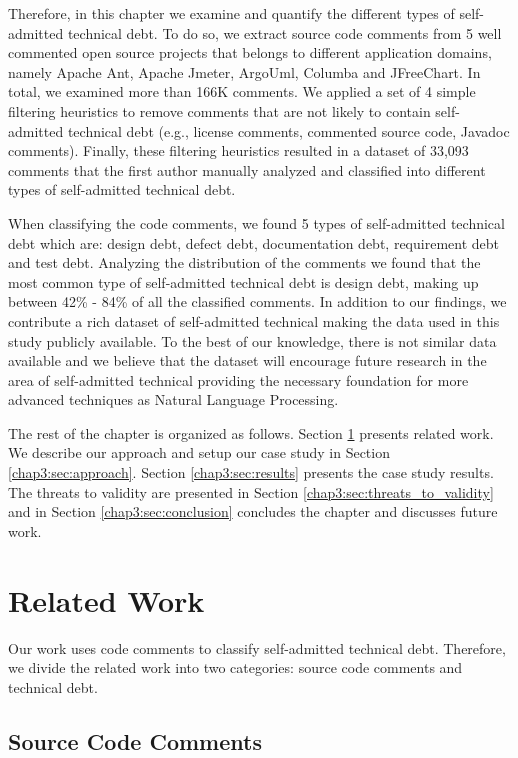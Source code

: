 Therefore, in this chapter we examine and quantify the different types of self-admitted technical debt. To do so, we extract source code comments from 5 well commented open source projects that belongs to different application domains, namely Apache Ant, Apache Jmeter, ArgoUml, Columba and JFreeChart. In total, we examined more than 166K comments. We applied a set of 4 simple filtering heuristics to remove comments that are not likely to contain self-admitted technical debt (e.g., license comments, commented source code, Javadoc comments). Finally, these filtering heuristics resulted in a dataset of 33,093 comments that the first author manually analyzed and classified into different types of self-admitted technical debt.

When classifying the code comments, we found 5 types of self-admitted technical debt which are: design debt, defect debt, documentation debt, requirement debt and test debt. Analyzing the distribution of the comments we found that the most common type of self-admitted technical debt is design debt, making up between 42\% - 84\% of all the classified comments. In addition to our findings, we contribute a rich dataset of self-admitted technical making the data used in this study publicly available. To the best of our knowledge, there is not similar data available and we believe that the dataset will encourage future research in the area of self-admitted technical providing the necessary foundation for more advanced techniques as Natural Language Processing.  

The rest of the chapter is organized as follows. Section \ref{chap3:sec:related_work} presents related work. We describe our approach and setup our case study in Section \ref{chap3:sec:approach}. Section \ref{chap3:sec:results} presents the case study results. The threats to validity are presented in Section \ref{chap3:sec:threats_to_validity} and in Section \ref{chap3:sec:conclusion} concludes the chapter and discusses future work. 

\section{Related Work}
\label{chap3:sec:related_work}
Our work uses code comments to classify self-admitted technical debt. Therefore, we divide the related work into two categories: source code comments and technical debt.

\subsection{Source Code Comments}

